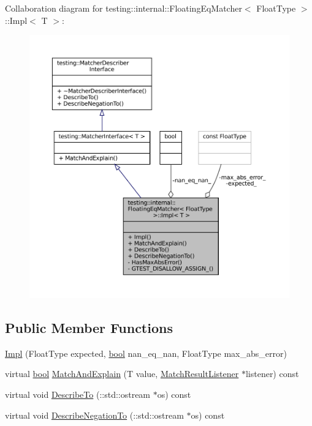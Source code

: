 Collaboration diagram for testing\+:\+:internal\+:\+:Floating\+Eq\+Matcher$<$ Float\+Type $>$\+:\+:Impl$<$ T $>$\+:
\nopagebreak
\begin{figure}[H]
\begin{center}
\leavevmode
\includegraphics[width=350pt]{classtesting_1_1internal_1_1FloatingEqMatcher_1_1Impl__coll__graph}
\end{center}
\end{figure}
\subsection*{Public Member Functions}
\begin{DoxyCompactItemize}
\item 
\hyperlink{classtesting_1_1internal_1_1FloatingEqMatcher_1_1Impl_a314057e171f872ad478b3e143121aecd}{Impl} (Float\+Type expected, \hyperlink{classbool}{bool} nan\+\_\+eq\+\_\+nan, Float\+Type max\+\_\+abs\+\_\+error)
\item 
virtual \hyperlink{classbool}{bool} \hyperlink{classtesting_1_1internal_1_1FloatingEqMatcher_1_1Impl_a4ce47c481fdc4973ed671a492f455f99}{Match\+And\+Explain} (T value, \hyperlink{classtesting_1_1MatchResultListener}{Match\+Result\+Listener} $\ast$listener) const
\item 
virtual void \hyperlink{classtesting_1_1internal_1_1FloatingEqMatcher_1_1Impl_aab6dbbe39ef8337e4686ae0f8c81a2c3}{Describe\+To} (\+::std\+::ostream $\ast$os) const
\item 
virtual void \hyperlink{classtesting_1_1internal_1_1FloatingEqMatcher_1_1Impl_a3eff238a812f4a105df1222a28f6cdbf}{Describe\+Negation\+To} (\+::std\+::ostream $\ast$os) const
\end{DoxyCompactItemize}
